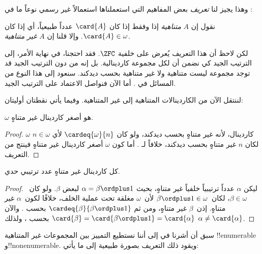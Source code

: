\documentclass[../../../include/open-logic-section]{subfiles}
\begin{document}
وهذا يجيز لنا \emph{تعريف} بعض المفاهيم التي استعملناها استعمالاً غير
رسمي نوعاً ما في :

\begin{defn}
نقول إن $A$ \emph{متناهية} إذا وفقط إذا كان $\card{A}$ عدداً طبيعياً،
أي إذا كان $\card{A} \in \omega$. وإلا قلنا إن $A$
\emph{غير متناهية}.
\end{defn}
\noindent
لكن لاحظ أن هذا التعريف يُعرض على خلفية $\ZFC$. فقد احتجنا، في نهاية
الأمر، إلى الترتيب الجيد كي نضمن أن لكل مجموعة كاردينالية. بل إنه من دون
الترتيب الجيد قد توجد مجموعة ليست متناهية ولا غير متناهية بحسب ديدكند.
سنعود إلى هذا النوع من المسائل في . أما الآن
فنواصل الاعتماد على الترتيب الجيد.

لننتقل الآن من الكاردينالات المتناهية إلى غير المتناهية. وفيما يأتي
نقطتان أوليتان:

\begin{cor}
$\omega$ هو أصغر كاردينال غير متناهٍ.
\end{cor}

\begin{proof}
$\omega$ كاردينال، لأنه غير متناهٍ بحسب ديدكند، ولو كان
$\cardeq{\omega}{n}$ لأي $n \in \omega$ لكان $n$ غير متناهٍ بحسب
ديدكند، خلافاً لـ
. أما كون
$\omega$ أصغر كاردينال غير متناهٍ فينتج من التعريف.
\end{proof}

\begin{cor}
كل كاردينال غير متناهٍ عدد ترتيبي حدي.
\end{cor}

\begin{proof}
ليكن $\alpha$ عدداً ترتيبياً خلفياً غير متناهٍ، بحيث
$\alpha = \beta \ordplus 1$ لبعض $\beta$. ولو كان~$\beta\in\omega$،
لكان~$\beta\ordplus 1\in\omega$ لأن~$\omega$ مغلقة تحت عملية الخلف،
خلافًا لكون~$\alpha$ غير متناهٍ. إذن~$\beta$ غير متناهٍ، ومن ثم
$\cardeq{\beta}{\beta \ordplus 1}$ بحسب
. والآن
$\card{\beta} = \card{\beta\ordplus 1} = \card{\alpha}$ بحسب
، ولذلك
$\alpha \neq \card{\alpha}$.
\end{proof}

سبق أن أشرنا في  إلى أننا
نستطيع التمييز بين المجموعات غير المتناهية !!{enumerable}
و!!{nonenumerable}. ويقود ذلك التعريف بصورة طبيعية إلى ما يأتي:
\end{document}
